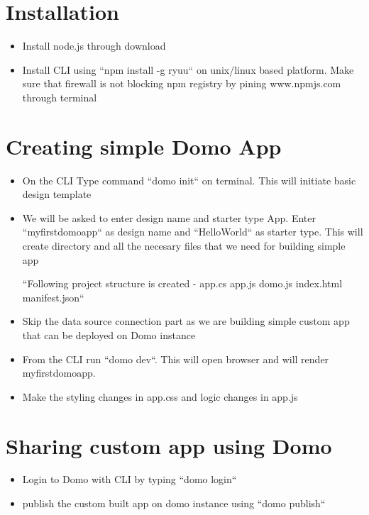 \section{Installation}
\begin{itemize}
\item Install node.js through download
\item Install CLI using ``npm install -g ryuu`` on unix/linux based platform. 
   Make sure that firewall is not blocking npm registry by pining
   www.npmjs.com through terminal
\end{itemize}


\section{Creating simple Domo App}
\begin{itemize}
\item On the CLI Type command  ``domo init`` on terminal.
   This will initiate basic design template
\item We will be asked to enter design name and starter type App. 
   Enter ``myfirstdomoapp`` as design name and ``HelloWorld`` as 
   starter type. This will create directory and all the necesary
   files that we need for building simple app

      ``Following project structure is created -
        app.cs
        app.js
        domo.js
        index.html
        manifest.json``~\cite{hid-sp18-523-Dev}

\item Skip the data source connection part as we are building simple
   custom app that can be deployed on Domo instance
\item From the CLI run ``domo dev``. This will open browser and will 
   render myfirstdomoapp.
\item Make the styling changes in app.css and logic changes in app.js

\end{itemize}


\section{Sharing custom app using Domo}
\begin{itemize}
\item Login to Domo with CLI by typing ``domo login``
\item publish the custom built app on domo instance
   using ``domo publish``
\end{itemize}


